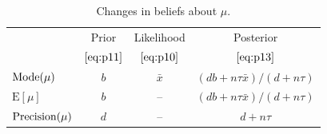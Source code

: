 {\begin{table}[ht]
\bigskip

\begin{tabular}{|l|c|c|c|}
\cline{2-4}
\multicolumn{1}{c|}{~}& Prior & Likelihood & Posterior \\
\multicolumn{1}{c|}{~}& $\eqref{eq:p11}$ & $\eqref{eq:p10}$ & $\eqref{eq:p13}$ \\
\hline
$\textnormal{Mode}(\mu)$ & $b$ & $\bar x$ & $(db+n\tau\bar x)/(d+n\tau)$ \\
$\text{E}[\mu]$ & $b$ & -- & $(db+n\tau\bar x)/(d+n\tau)$ \\
$\textnormal{Precision}(\mu)$ & $d$ & -- & $d+n\tau$ \\
\hline
\end{tabular}
\caption{Changes in beliefs about $\mu$.}
\label{tab:norknown}

\end{table}}

\newpage


